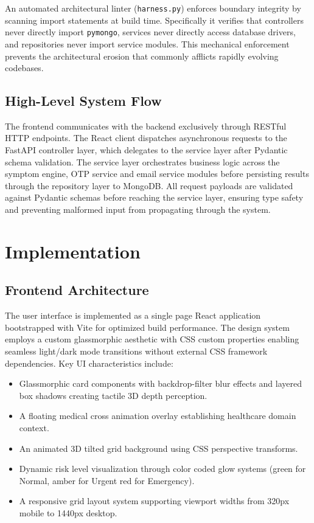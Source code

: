 \documentclass[conference]{IEEEtran}
\begin{document}
An automated architectural linter (\texttt{harness.py}) enforces boundary integrity by scanning import statements at build time. Specifically it verifies that controllers never directly import \texttt{pymongo}, services never directly access database drivers, and repositories never import service modules. This mechanical enforcement prevents the architectural erosion that commonly afflicts rapidly evolving codebases.

\subsection{High-Level System Flow}

The frontend communicates with the backend exclusively through RESTful HTTP endpoints. The React client dispatches asynchronous requests to the FastAPI controller layer, which delegates to the service layer after Pydantic schema validation. The service layer orchestrates business logic across the symptom engine, OTP service and email service modules before persisting results through the repository layer to MongoDB. All request payloads are validated against Pydantic schemas before reaching the service layer, ensuring type safety and preventing malformed input from propagating through the system.

\section{Implementation}

\subsection{Frontend Architecture}

The user interface is implemented as a single page React application bootstrapped with Vite for optimized build performance. The design system employs a custom glassmorphic aesthetic with CSS custom properties enabling seamless light/dark mode transitions without external CSS framework dependencies. Key UI characteristics include:

\begin{itemize}
\item Glassmorphic card components with backdrop-filter blur effects and layered box shadows creating tactile 3D depth perception.
\item A floating medical cross animation overlay establishing healthcare domain context.
\item An animated 3D tilted grid background using CSS perspective transforms.
\item Dynamic risk level visualization through color coded glow systems (green for Normal, amber for Urgent red for Emergency).
\item A responsive grid layout system supporting viewport widths from 320px mobile to 1440px desktop.
\end{itemize}
\end{document}
